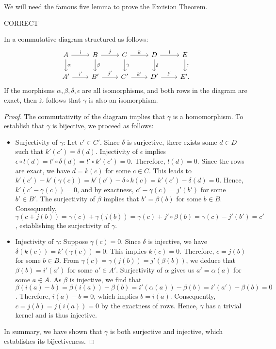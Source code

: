 We will need the famous five lemma to prove the Excision Theorem.


CORRECT

\begin{lemma}
\label{fivelemma}
In a commutative diagram structured as follows:
\begin{equation}
\begin{tikzcd}
A \arrow[r, "i"] \arrow[d, "\alpha"] & B \arrow[r, "j"] \arrow[d, "\beta"] & C \arrow[r, "k"] \arrow[d, "\gamma"] & D \arrow[r, "l"] \arrow[d, "\delta"] & E \arrow[d, "\epsilon"] \\
A' \arrow[r, "i'"]                               & B' \arrow[r, "j'"]                              & C' \arrow[r, "k'"]                               & D' \arrow[r, "l'"]                               & E'.                                 
\end{tikzcd}
\end{equation}
If the morphisms $\alpha, \beta, \delta, \epsilon$ are all isomorphisms, and both rows in the diagram are exact, then it follows that $\gamma$ is also an isomorphism.
\end{lemma}

\begin{proof}
The commutativity of the diagram implies that $\gamma$ is a homomorphism. To establish that $\gamma$ is bijective, we proceed as follows:
\begin{itemize}
    \item Surjectivity of $\gamma$: Let $c' \in C'$. Since $\delta$ is surjective, there exists some $d \in D$ such that $k'(c') = \delta(d)$. Injectivity of $\epsilon$ implies $\epsilon \circ l(d) = l' \circ \delta(d) = l' \circ k'(c') = 0$. Therefore, $l(d) = 0$. Since the rows are exact, we have $d = k(c)$ for some $c \in C$. This leads to $k'(c') - k'(\gamma(c)) = k'(c') - \delta \circ k(c) = k'(c') - \delta(d) = 0$. Hence, $k'(c' - \gamma(c)) = 0$, and by exactness, $c' - \gamma(c) = j'(b')$ for some $b' \in B'$. The surjectivity of $\beta$ implies that $b' = \beta(b)$ for some $b \in B$. Consequently, $\gamma(c + j(b)) = \gamma(c) + \gamma(j(b)) = \gamma(c) + j' \circ \beta(b) = \gamma(c) - j'(b') = c'$, establishing the surjectivity of $\gamma$.
    \item Injectivity of $\gamma$: Suppose $\gamma(c) = 0$. Since $\delta$ is injective, we have $\delta(k(c)) = k'(\gamma(c)) = 0$. This implies $k(c) = 0$. Therefore, $c = j(b)$ for some $b \in B$. From $\gamma(c) = \gamma(j(b)) = j'(\beta(b))$, we deduce that $\beta(b) = i'(a')$ for some $a' \in A'$. Surjectivity of $\alpha$ gives us $a' = \alpha(a)$ for some $a \in A$. As $\beta$ is injective, we find that $\beta(i(a) - b) = \beta(i(a)) - \beta(b) = i'(\alpha(a)) - \beta(b) = i'(a') - \beta(b) = 0$. Therefore, $i(a) - b = 0$, which implies $b = i(a)$. Consequently, $c = j(b) = j(i(a)) = 0$ by the exactness of rows. Hence, $\gamma$ has a trivial kernel and is thus injective.
\end{itemize}
In summary, we have shown that $\gamma$ is both surjective and injective, which establishes its bijectiveness.
\end{proof}


